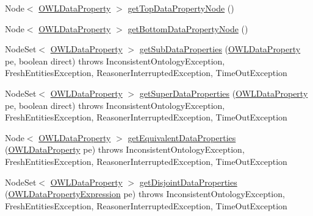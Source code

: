 \begin{DoxyCompactItemize}
\item 
Node$<$ \hyperlink{interfaceorg_1_1semanticweb_1_1owlapi_1_1model_1_1_o_w_l_data_property}{O\-W\-L\-Data\-Property} $>$ \hyperlink{classorg_1_1semanticweb_1_1owlapi_1_1reasoner_1_1structural_1_1_structural_reasoner_a38bf000603c4626c3d451c9c3575eabf}{get\-Top\-Data\-Property\-Node} ()
\item 
Node$<$ \hyperlink{interfaceorg_1_1semanticweb_1_1owlapi_1_1model_1_1_o_w_l_data_property}{O\-W\-L\-Data\-Property} $>$ \hyperlink{classorg_1_1semanticweb_1_1owlapi_1_1reasoner_1_1structural_1_1_structural_reasoner_a27df5caa10cc42e599930cebbdb1aa0c}{get\-Bottom\-Data\-Property\-Node} ()
\item 
Node\-Set$<$ \hyperlink{interfaceorg_1_1semanticweb_1_1owlapi_1_1model_1_1_o_w_l_data_property}{O\-W\-L\-Data\-Property} $>$ \hyperlink{classorg_1_1semanticweb_1_1owlapi_1_1reasoner_1_1structural_1_1_structural_reasoner_a07a890369477c086b83381f4c423fbe6}{get\-Sub\-Data\-Properties} (\hyperlink{interfaceorg_1_1semanticweb_1_1owlapi_1_1model_1_1_o_w_l_data_property}{O\-W\-L\-Data\-Property} pe, boolean direct)  throws Inconsistent\-Ontology\-Exception, Fresh\-Entities\-Exception, Reasoner\-Interrupted\-Exception, Time\-Out\-Exception 
\item 
Node\-Set$<$ \hyperlink{interfaceorg_1_1semanticweb_1_1owlapi_1_1model_1_1_o_w_l_data_property}{O\-W\-L\-Data\-Property} $>$ \hyperlink{classorg_1_1semanticweb_1_1owlapi_1_1reasoner_1_1structural_1_1_structural_reasoner_a414eee69b2181906981fe1aefb97f3ff}{get\-Super\-Data\-Properties} (\hyperlink{interfaceorg_1_1semanticweb_1_1owlapi_1_1model_1_1_o_w_l_data_property}{O\-W\-L\-Data\-Property} pe, boolean direct)  throws Inconsistent\-Ontology\-Exception, Fresh\-Entities\-Exception, Reasoner\-Interrupted\-Exception, Time\-Out\-Exception 
\item 
Node$<$ \hyperlink{interfaceorg_1_1semanticweb_1_1owlapi_1_1model_1_1_o_w_l_data_property}{O\-W\-L\-Data\-Property} $>$ \hyperlink{classorg_1_1semanticweb_1_1owlapi_1_1reasoner_1_1structural_1_1_structural_reasoner_a885655e8d365ff66926491004a123161}{get\-Equivalent\-Data\-Properties} (\hyperlink{interfaceorg_1_1semanticweb_1_1owlapi_1_1model_1_1_o_w_l_data_property}{O\-W\-L\-Data\-Property} pe)  throws Inconsistent\-Ontology\-Exception, Fresh\-Entities\-Exception, Reasoner\-Interrupted\-Exception, Time\-Out\-Exception 
\item 
Node\-Set$<$ \hyperlink{interfaceorg_1_1semanticweb_1_1owlapi_1_1model_1_1_o_w_l_data_property}{O\-W\-L\-Data\-Property} $>$ \hyperlink{classorg_1_1semanticweb_1_1owlapi_1_1reasoner_1_1structural_1_1_structural_reasoner_af698a29d193b79311d9de084349dde9c}{get\-Disjoint\-Data\-Properties} (\hyperlink{interfaceorg_1_1semanticweb_1_1owlapi_1_1model_1_1_o_w_l_data_property_expression}{O\-W\-L\-Data\-Property\-Expression} pe)  throws Inconsistent\-Ontology\-Exception, Fresh\-Entities\-Exception, Reasoner\-Interrupted\-Exception, Time\-Out\-Exception 

\end{DoxyCompactItemize}
